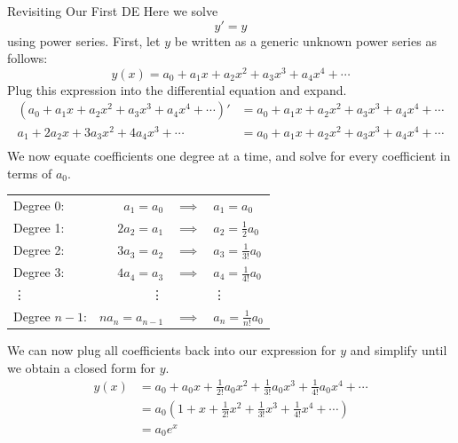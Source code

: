 \begin{example}{Revisiting Our First DE}
Here we solve $$y'=y $$ using power series.  First, let $y$ be written as a generic unknown power series as follows: $$y(x)=a_0+a_1x+a_2x^2+a_3x^3+a_4x^4+\cdots $$ Plug this expression into the differential equation and expand. \begin{align*}\left(a_0+a_1x+a_2x^2+a_3x^3+a_4x^4+\cdots \right)'&=a_0+a_1x+a_2x^2+a_3x^3+a_4x^4+\cdots \\
a_1+2a_2x+3a_3x^2+4a_4x^3+\cdots &=a_0+a_1x+a_2x^2+a_3x^3+a_4x^4+\cdots \\
\end{align*}
We now equate coefficients one degree at a time, and solve for every coefficient in terms of $a_0$.
\begin{center}
\begin{tabular}{lrcl}
Degree 0: & $a_1=a_0$ & $\implies$ & $a_1=a_0$ \\
Degree 1: & $2a_2=a_1$ & $\implies$ & $a_2=\frac{1}{2}a_0$ \\
Degree 2: & $3a_3=a_2$ & $\implies $& $a_3=\frac{1}{3!}a_0$ \\
Degree 3: & $4a_4=a_3$ & $\implies $& $a_4=\frac{1}{4!}a_0$ \\
\hspace{.2in} \vdots  & \vdots \hspace{.2in} & &\hspace{.17in} \vdots \\
Degree $n-1$: & $na_n=a_{n-1}$ & $\implies$ & $a_n=\frac{1}{n!}a_0$ 
\end{tabular}
\end{center}

We can now plug all coefficients back into our expression for $y$ and simplify until we obtain a closed form for $y$.  \begin{align*}
 y(x)&=a_0+a_0x+\frac{1}{2!}a_0x^2+\frac{1}{3!}a_0x^3+\frac{1}{4!}a_0x^4+\cdots \\
 &=a_0\left(1+x+\frac{1}{2!}x^2+\frac{1}{3!}x^3+\frac{1}{4!}x^4+\cdots \right)
\\
&=a_0e^x
\end{align*}
\end{example}

